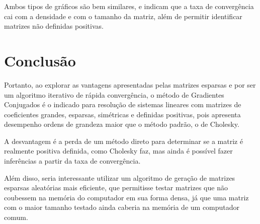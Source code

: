 \documentclass[a4paper,11pt]{article}
\begin{document}
      Ambos tipos de gráficos são bem similares, e indicam que a taxa de convergência cai com a densidade e com o tamanho da matriz,
      além de permitir identificar matrizes não definidas positivas.

    \newpage
    \section*{Conclusão}
      Portanto, ao explorar as vantagens apresentadas pelas matrizes esparsas e por ser um algoritmo iterativo de rápida convergência,
      o método de Gradientes Conjugados é o indicado para resolução de sistemas lineares com matrizes de coeficientes grandes, esparsas,
      simétricas e definidas positivas, pois apresenta desempenho ordens de grandeza maior que o método padrão, o de Cholesky.

      A desvantagem é a perda de um método direto para determinar se a matriz é realmente positiva definida, como Cholesky faz,
      mas ainda é possível fazer inferências a partir da taxa de convergência.

      Além disso, seria interessante utilizar um algoritmo de geração de matrizes esparsas aleatórias mais eficiente, que permitisse
      testar matrizes que não coubessem na memória do computador em sua forma densa, já que uma matriz com o maior tamanho testado ainda
      caberia na memória de um computador comum.

\end{document}
